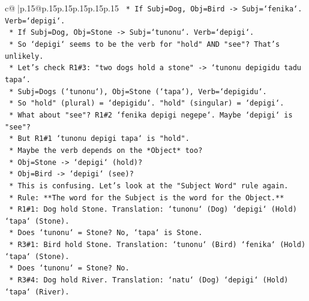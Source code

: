 \documentclass{article}
\begin{document}
{\begin{supertabular}{c@{$\;$}|p{.15\linewidth}@{}p{.15\linewidth}p{.15\linewidth}p{.15\linewidth}p{.15\linewidth}p{.15\linewidth}}
{{{\texttt{                        *   If Subj=Dog, Obj=Bird {-}> Subj=`fenika`. Verb=`depigi`.} \\
\texttt{                        *   If Subj=Dog, Obj=Stone {-}> Subj=`tunonu`. Verb=`depigi`.} \\
\texttt{                        *   So `depigi` seems to be the verb for "hold" AND "see"? That's unlikely.} \\
\texttt{                        *   Let's check R1\#3: "two dogs hold a stone" {-}> `tunonu depigidu tadu tapa`.} \\
\texttt{                            *   Subj=Dogs (`tunonu`), Obj=Stone (`tapa`), Verb=`depigidu`.} \\
\texttt{                            *   So "hold" (plural) = `depigidu`. "hold" (singular) = `depigi`.} \\
\texttt{                            *   What about "see"? R1\#2 `fenika depigi negepe`. Maybe `depigi` is "see"?} \\
\texttt{                            *   But R1\#1 `tunonu depigi tapa` is "hold".} \\
\texttt{                            *   Maybe the verb depends on the *Object* too?} \\
\texttt{                                *   Obj=Stone {-}> `depigi` (hold)?} \\
\texttt{                                *   Obj=Bird {-}> `depigi` (see)?} \\
\texttt{                                *   This is confusing. Let's look at the "Subject Word" rule again.} \\
\texttt{                                *   Rule: **The word for the Subject is the word for the Object.**} \\
\texttt{                                    *   R1\#1: Dog hold Stone. Translation: `tunonu` (Dog) `depigi` (Hold) `tapa` (Stone).} \\
\texttt{                                        *   Does `tunonu` = Stone? No, `tapa` is Stone.} \\
\texttt{                                    *   R3\#1: Bird hold Stone. Translation: `tunonu` (Bird) `fenika` (Hold) `tapa` (Stone).} \\
\texttt{                                        *   Does `tunonu` = Stone? No.} \\
\texttt{                                    *   R3\#4: Dog hold River. Translation: `natu` (Dog) `depigi` (Hold) `tapa` (River).} \\
}}}
\end{supertabular}}
\end{document}
